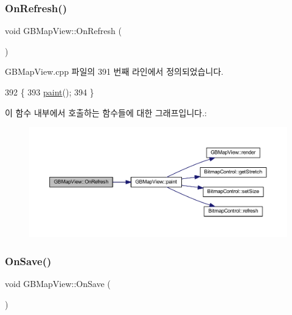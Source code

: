 \subsubsection{\texorpdfstring{On\+Refresh()}{OnRefresh()}}
{\footnotesize\ttfamily void G\+B\+Map\+View\+::\+On\+Refresh (\begin{DoxyParamCaption}{ }\end{DoxyParamCaption})\hspace{0.3cm}{\ttfamily [protected]}}



G\+B\+Map\+View.\+cpp 파일의 391 번째 라인에서 정의되었습니다.


\begin{DoxyCode}
392 \{
393   \mbox{\hyperlink{class_g_b_map_view_a42de669273417186b01ca6f8d06eb347}{paint}}();
394 \}
\end{DoxyCode}
이 함수 내부에서 호출하는 함수들에 대한 그래프입니다.\+:
\nopagebreak
\begin{figure}[H]
\begin{center}
\leavevmode
\includegraphics[width=350pt]{class_g_b_map_view_ac34b80cd3cb8b8b6d434e59dcfb3bed2_cgraph}
\end{center}
\end{figure}
\mbox{\label{class_g_b_map_view_a667f0f830b816e2ec34519d75a5ad488}} 
\subsubsection{\texorpdfstring{On\+Save()}{OnSave()}}
{\footnotesize\ttfamily void G\+B\+Map\+View\+::\+On\+Save (\begin{DoxyParamCaption}{ }\end{DoxyParamCaption})\hspace{0.3cm}{\ttfamily [protected]}}



